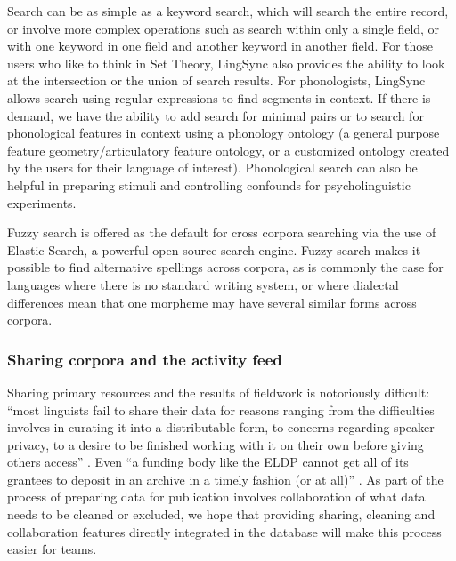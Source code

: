 \documentclass[letterpaper, 12pt, dvips]{mitwpl}
\begin{document}
Search can be as simple as a keyword search,
which will search the entire record,
or involve more complex operations such as search within only a single field,
or with one keyword in one field and another keyword in another field. 
For those users who like to think in Set Theory, LingSync also provides the ability to look at the intersection or the union of search results. 
For phonologists, LingSync allows search using regular expressions to find segments in context.
If there is demand, we have the ability to add search for minimal pairs or to search for phonological features in context using a phonology ontology (a general purpose feature geometry/articulatory feature ontology,
or a customized ontology created by the users for their language of interest). 
Phonological search can also be helpful in %
preparing stimuli and controlling confounds for psycholinguistic experiments.

Fuzzy search is offered as the default for cross corpora searching via the use of Elastic Search, a powerful open source search engine. Fuzzy search makes it possible to find alternative spellings across corpora, as is commonly the case for languages where there is no standard writing system, or where dialectal differences mean that one morpheme may have several similar forms across corpora.  

\subsubsection{Sharing corpora and the
activity feed}
\label{sec:sharingactivityfeeds}

Sharing primary resources and the results of fieldwork is notoriously difficult: 
``most linguists fail to share their data for reasons ranging from the difficulties involves in curating it into a distributable form, 
to concerns regarding speaker privacy, to a desire to be finished working with it on their own before giving others access'' \citep{Bender:2010}. 
Even ``a funding body like the ELDP cannot get all of its grantees to deposit in an archive in a timely fashion (or at all)'' \citep{Thieberger:2012}. 
As part of the process of preparing data for publication involves collaboration of what data needs to be cleaned or excluded, we hope that providing sharing, cleaning and collaboration features directly integrated in the database will make this process easier for teams.
\end{document}

